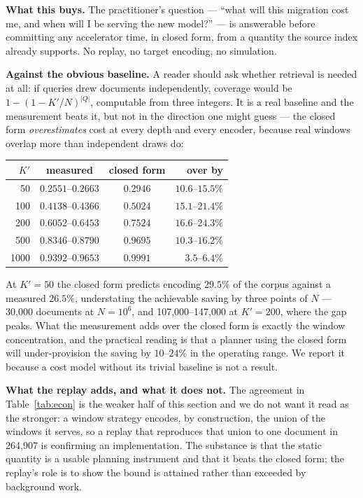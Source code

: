 \documentclass[conference]{IEEEtran}
\begin{document}
\textbf{What this buys.} The practitioner's question --- ``what will this migration cost
me, and when will I be serving the new model?'' --- is answerable before committing any
accelerator time, in closed form, from a quantity the source index already supports. No
replay, no target encoding, no simulation.

\textbf{Against the obvious baseline.} A reader should ask whether retrieval is needed at all:
if queries drew documents independently, coverage would be $1 - (1 - K'/N)^{|Q|}$, computable
from three integers. It is a real baseline and the measurement beats it, but not in the
direction one might guess --- the closed form \emph{overestimates} cost at every depth and every
encoder, because real windows overlap more than independent draws do:

\begin{center}
\small
\begin{tabular}{@{}rccr@{}}
\toprule
$K'$ & measured & closed form & over by \\
\midrule
50   & $0.2551$--$0.2663$ & $0.2946$ & $10.6$--$15.5\%$ \\
100  & $0.4138$--$0.4366$ & $0.5024$ & $15.1$--$21.4\%$ \\
200  & $0.6052$--$0.6453$ & $0.7524$ & $16.6$--$24.3\%$ \\
500  & $0.8346$--$0.8790$ & $0.9695$ & $10.3$--$16.2\%$ \\
1000 & $0.9392$--$0.9653$ & $0.9991$ & $3.5$--$6.4\%$ \\
\bottomrule
\end{tabular}
\end{center}

At $K' = 50$ the closed form predicts encoding $29.5\%$ of the corpus against a measured
$26.5\%$, understating the achievable saving by three points of $N$ --- 30{,}000 documents at
$N = 10^6$, and 107{,}000--147{,}000 at $K' = 200$, where the gap peaks. What the measurement
adds over the closed form is exactly the window concentration, and the practical reading is
that a planner using the closed form will under-provision the saving by $10$--$24\%$ in the
operating range. We report it because a cost model without its trivial baseline is not a
result.

\textbf{What the replay adds, and what it does not.} The agreement in
Table~\ref{tab:econ} is the weaker half of this section and we do not want it read as the
stronger: a window strategy encodes, by construction, the union of the windows it serves, so a
replay that reproduces that union to one document in 264{,}907 is confirming an
implementation. The substance is that the static quantity is a usable planning instrument and
that it beats the closed form; the replay's role is to show the bound is attained rather than
exceeded by background work.
\end{document}
